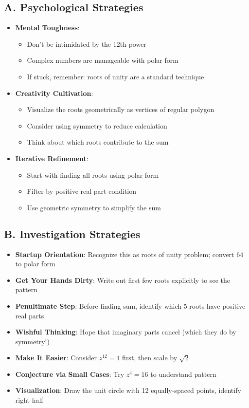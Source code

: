 \documentclass[11pt]{article}
\begin{document}
\begin{strategicbox}
\subsection*{A. Psychological Strategies}
\begin{itemize}[leftmargin=*]
    \item \textbf{Mental Toughness}: 
    \begin{itemize}
        \item Don't be intimidated by the 12th power
        \item Complex numbers are manageable with polar form
        \item If stuck, remember: roots of unity are a standard technique
    \end{itemize}
    \item \textbf{Creativity Cultivation}: 
    \begin{itemize}
        \item Visualize the roots geometrically as vertices of regular polygon
        \item Consider using symmetry to reduce calculation
        \item Think about which roots contribute to the sum
    \end{itemize}
    \item \textbf{Iterative Refinement}: 
    \begin{itemize}
        \item Start with finding all roots using polar form
        \item Filter by positive real part condition
        \item Use geometric symmetry to simplify the sum
    \end{itemize}
\end{itemize}

\subsection*{B. Investigation Strategies}
\begin{itemize}[leftmargin=*]
    \item \textbf{Startup Orientation}: Recognize this as roots of unity problem; convert $64$ to polar form
    \item \textbf{Get Your Hands Dirty}: Write out first few roots explicitly to see the pattern
    \item \textbf{Penultimate Step}: Before finding sum, identify which 5 roots have positive real parts
    \item \textbf{Wishful Thinking}: Hope that imaginary parts cancel (which they do by symmetry!)
    \item \textbf{Make It Easier}: Consider $z^{12}=1$ first, then scale by $\sqrt{2}$
    \item \textbf{Conjecture via Small Cases}: Try $z^4=16$ to understand pattern
    \item \textbf{Visualization}: Draw the unit circle with 12 equally-spaced points, identify right half
\end{itemize}


\end{strategicbox}
\end{document}
